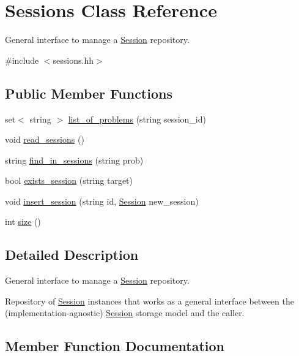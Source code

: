 \hypertarget{classSessions}{}\section{Sessions Class Reference}
\label{classSessions}


General interface to manage a \hyperlink{classSession}{Session} repository.  




{\ttfamily \#include $<$sessions.\+hh$>$}

\subsection*{Public Member Functions}
\begin{DoxyCompactItemize}
\item 
set$<$ string $>$ \hyperlink{classSessions_a718f8c6c45ba188c3223334a6b636c96}{list\+\_\+of\+\_\+problems} (string session\+\_\+id)
\item 
void \hyperlink{classSessions_ad64feefd5a922b325e3e58d2462a5c4d}{read\+\_\+sessions} ()
\item 
string \hyperlink{classSessions_a16396f8b9ae0bb03f382636a733f9aa5}{find\+\_\+in\+\_\+sessions} (string prob)
\item 
bool \hyperlink{classSessions_a4298c2fc46ab30d4785f831712b6c5d0}{exists\+\_\+session} (string target)
\item 
void \hyperlink{classSessions_a63bf568976dda1bfdd5d324930bf860b}{insert\+\_\+session} (string id, \hyperlink{classSession}{Session} new\+\_\+session)
\item 
int \hyperlink{classSessions_a997503177f5cde1a81668df6dfbc64a8}{size} ()
\end{DoxyCompactItemize}


\subsection{Detailed Description}
General interface to manage a \hyperlink{classSession}{Session} repository. 

Repository of \hyperlink{classSession}{Session} instances that works as a general interface between the (implementation-\/agnostic) \hyperlink{classSession}{Session} storage model and the caller. 

\subsection{Member Function Documentation}
\mbox{\label{classSessions_a4298c2fc46ab30d4785f831712b6c5d0}} 
